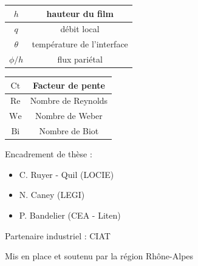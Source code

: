 \documentclass[a0,portrait]{a0poster}
\begin{document}
\begin{multicols}{2}
    \begin{center}
        \begin{tabular}{|c|c|}
            \hline $h$ & hauteur du film \\
            \hline $q$ & débit local \\
            \hline $\theta$ & température de l'interface \\
            \hline $\phi / h$ &  flux pariétal\\
            \hline
        \end{tabular}
        \begin{tabular}{|c|c|}
            \hline $\mathrm{Ct}$ & Facteur de pente \\
            \hline $\mathrm{Re}$ & Nombre de Reynolds \\
            \hline $\mathrm{W\!e}$ & Nombre de Weber \\
            \hline $\mathrm{Bi}$ & Nombre de Biot \\
            \hline
        \end{tabular}
    \end{center}
    \columnbreak
        Encadrement de thèse :
        \begin{itemize}
            \item C. Ruyer - Quil (LOCIE)
            \item N. Caney (LEGI)
            \item P. Bandelier (CEA - Liten)
        \end{itemize}

        Partenaire industriel : CIAT

        Mis en place et soutenu par la région Rhône-Alpes
\end{multicols}
\end{document}

